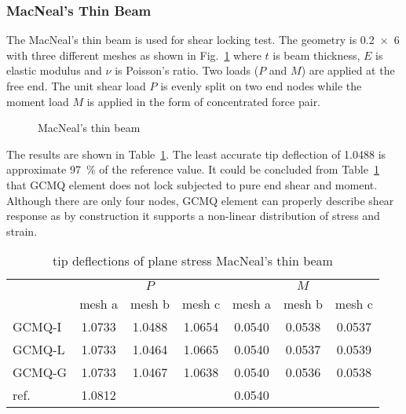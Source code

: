 \documentclass[3p,sort&compress,review,11pt]{elsarticle}
\newcommand*{\figref}[1]{Fig.~\ref{#1}}
\newcommand*{\tabref}[1]{Table~\ref{#1}}
\begin{document}
\subsubsection{MacNeal's Thin Beam}
The MacNeal's thin beam \citep{MacNeal1985} is used for shear locking test. The geometry is \num{0.2x6} with three different meshes as shown in \figref{example:macneals_beam} where $t$ is beam thickness, $E$ is elastic modulus and $\nu$ is Poisson's ratio. Two loads ($P$ and $M$) are applied at the free end. The unit shear load $P$ is evenly split on two end nodes while the moment load $M$ is applied in the form of concentrated force pair.
\begin{figure}[H]
\centering\scriptsize
{}
\caption{MacNeal's thin beam}\label{example:macneals_beam}
\end{figure}

The results are shown in \tabref{table:macneals_beam_shear}. The least accurate tip deflection of \num{1.0488} is approximate \SI{97}{\percent} of the reference value. It could be concluded from \tabref{table:macneals_beam_shear} that GCMQ element does not lock subjected to pure end shear and moment. Although there are only four nodes, GCMQ element can properly describe shear response as by construction it supports a non-linear distribution of stress and strain.
\begin{table}[H]
\centering\scriptsize
\caption{tip deflections of plane stress MacNeal's thin beam}\label{table:macneals_beam_shear}
\begin{tabular}{lcccccc}
	\toprule
	                      & \multicolumn{3}{c}{$P$}  & \multicolumn{3}{c}{$M$}  \\
	                      & mesh a & mesh b & mesh c & mesh a & mesh b & mesh c \\ \midrule
	GCMQ-I                & 1.0733 & 1.0488 & 1.0654 & 0.0540 & 0.0538 & 0.0537 \\
	GCMQ-L                & 1.0733 & 1.0464 & 1.0665 & 0.0540 & 0.0537 & 0.0539 \\
	GCMQ-G                & 1.0733 & 1.0467 & 1.0638 & 0.0540 & 0.0536 & 0.0538 \\ \midrule
	ref. \citep{Cen2015} & 1.0812 &        &        & 0.0540 &        &        \\ \bottomrule
\end{tabular}
\end{table}
\end{document}
